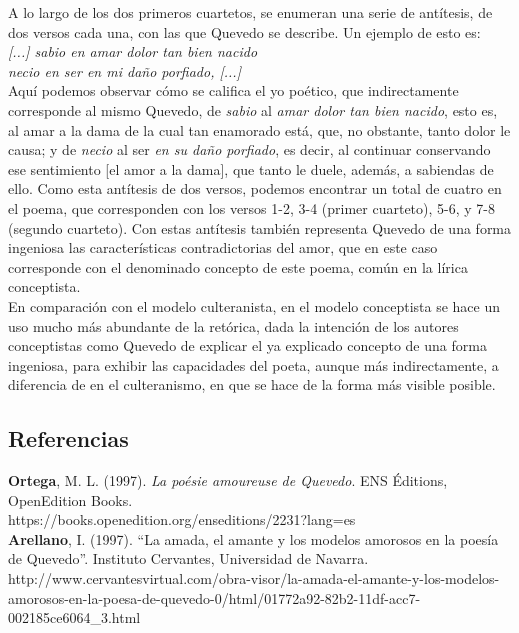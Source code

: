 \documentclass[12pt,a4paper]{article}
\begin{document}
A lo largo de los dos primeros cuartetos, se enumeran una serie de antítesis, de dos versos cada una, con las que Quevedo se describe. Un ejemplo de esto es:\\

\indent \textit{[...] sabio en amar dolor tan bien nacido}\\
\indent \textit{necio en ser en mi daño porfiado, [...]}\\

Aquí podemos observar cómo se califica el yo poético, que indirectamente corresponde al mismo Quevedo, de \textit{sabio} al \textit{amar dolor tan bien nacido}, esto es, al amar a la dama de la cual tan enamorado está, que, no obstante, tanto dolor le causa; y de \textit{necio} al ser \textit{en su daño porfiado}, es decir, al continuar conservando ese sentimiento [el amor a la dama], que tanto le duele, además, a sabiendas de ello. Como esta antítesis de dos versos, podemos encontrar un total de cuatro en el poema, que corresponden con los versos 1-2, 3-4 (primer cuarteto), 5-6, y 7-8 (segundo cuarteto). Con estas antítesis también representa Quevedo de una forma ingeniosa las características contradictorias del amor, que en este caso corresponde con el denominado concepto de este poema, común en la lírica conceptista.\\

En comparación con el modelo culteranista, en el modelo conceptista se hace un uso mucho más abundante de la retórica, dada la intención de los autores conceptistas como Quevedo de explicar el ya explicado concepto de una forma ingeniosa, para exhibir las capacidades del poeta, aunque más indirectamente, a diferencia de en el culteranismo, en que se hace de la forma más visible posible.\\


\subsection{Referencias}

\textbf{Ortega}, M. L. (1997). \textit{La poésie amoureuse de Quevedo}. ENS Éditions, OpenEdition Books.\\
https://books.openedition.org/enseditions/2231?lang=es\\

\textbf{Arellano}, I. (1997). ``La amada, el amante y los modelos amorosos en la poesía de Quevedo''. Instituto Cervantes, Universidad de Navarra.\\
http://www.cervantesvirtual.com/obra-visor/la-amada-el-amante-y-los-modelos-amorosos-en-la-poesa-de-quevedo-0/html/01772a92-82b2-11df-acc7-002185ce6064_3.html\\
\end{document}
